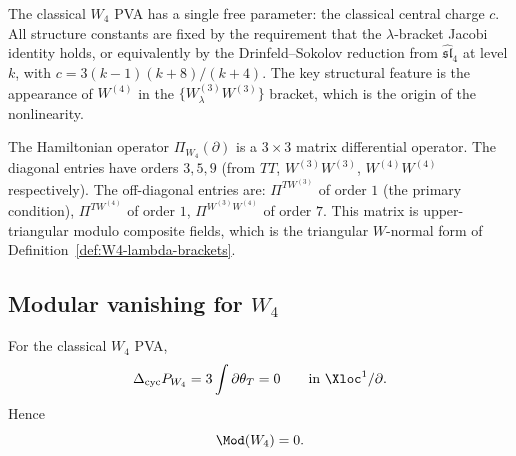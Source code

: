 \begin{remark}
The classical $W_4$ PVA has a single free parameter: the classical central
charge $c$. All structure constants are fixed by the requirement that the
$\lambda$-bracket Jacobi identity holds, or equivalently by the Drinfeld--Sokolov
reduction from $\widehat{\mathfrak{sl}}_4$ at level $k$, with $c = 3(k-1)(k+8)/(k+4)$.
The key structural feature is the appearance of $W^{(4)}$ in the
$\{W^{(3)}_\lambda W^{(3)}\}$ bracket, which is the origin of the
nonlinearity.
\end{remark}

\begin{remark}
The Hamiltonian operator $\Pi_{W_4}(\partial)$ is a $3\times 3$ matrix
differential operator. The diagonal entries have orders
$3, 5, 9$ (from $TT$, $W^{(3)}W^{(3)}$, $W^{(4)}W^{(4)}$ respectively).
The off-diagonal entries are:
$\Pi^{TW^{(3)}}$ of order $1$ (the primary condition),
$\Pi^{TW^{(4)}}$ of order $1$,
$\Pi^{W^{(3)}W^{(4)}}$ of order $7$.
This matrix is upper-triangular modulo composite fields, which is the
triangular $W$-normal form of Definition~\ref{def:W4-lambda-brackets}.
\end{remark}

\subsection{Modular vanishing for $W_4$}

\begin{theorem}
For the classical $W_4$ PVA,
\[
\Delta_{\mathrm{cyc}} P_{W_4} = 3\int\partial\theta_T = 0
\qquad\text{in }\Xloc^1/\partial.
\]
Hence
\[
\Mod(W_4) = 0.
\]
\end{theorem}

